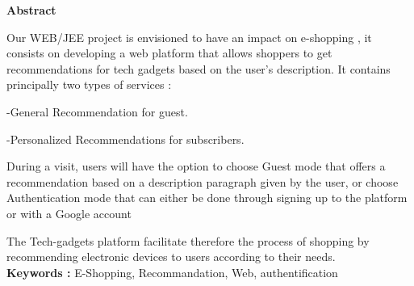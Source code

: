\renewcommand{\abstractnamefont}{\normalfont\LARGE\bfseries}


\newpage
{}
	\begin{center}
	\textbf{ Abstract}
	\end{center}
\begin{spacing}{1.3}


Our WEB/JEE project is envisioned to have an impact on e-shopping , it consists on developing a web platform that allows shoppers to get recommendations for tech gadgets based on the user's description. It contains principally two types of services : 


-General Recommendation for guest.

-Personalized Recommendations for subscribers.


During a visit, users will have the option to choose Guest mode that offers a recommendation based on a description paragraph given by the user, or choose Authentication mode that can either be done through signing up to the platform or with a Google account 

The Tech-gadgets platform facilitate therefore the process of shopping by recommending electronic devices to users according to their needs.\\

\textbf{Keywords :} E-Shopping, Recommandation, Web, authentification
\end{spacing} 





\newpage

